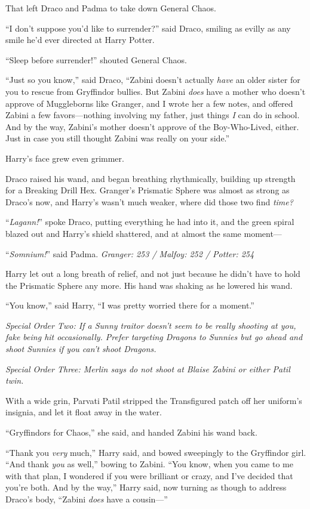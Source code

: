 That left Draco and Padma to take down General Chaos.

“I don’t suppose you’d like to surrender?” said Draco, smiling as evilly as any smile he’d ever directed at Harry Potter.

“Sleep before surrender!” shouted General Chaos.

“Just so you know,” said Draco, “Zabini doesn’t actually \emph{have} an older sister for you to rescue from Gryffindor bullies. But Zabini \emph{does} have a mother who doesn’t approve of Muggleborns like Granger, and I wrote her a few notes, and offered Zabini a few favors—nothing involving my father, just things \emph{I} can do in school. And by the way, Zabini’s mother doesn’t approve of the Boy-Who-Lived, either. Just in case you still thought Zabini was really on your side.”

Harry’s face grew even grimmer.

Draco raised his wand, and began breathing rhythmically, building up strength for a Breaking Drill Hex. Granger’s Prismatic Sphere was almost as strong as Draco’s now, and Harry’s wasn’t much weaker, where did those two find \emph{time?}

“\emph{Lagann!}” spoke Draco, putting everything he had into it, and the green spiral blazed out and Harry’s shield shattered, and at almost the same moment—

“\emph{Somnium!}” said Padma.
\sbreak
\emph{Granger: 253 / Malfoy: 252 / Potter: 254}

Harry let out a long breath of relief, and not just because he didn’t have to hold the Prismatic Sphere any more. His hand was shaking as he lowered his wand.

“You know,” said Harry, “I was pretty worried there for a moment.”

\emph{Special Order Two: If a Sunny traitor doesn’t seem to be really shooting at you, fake being hit occasionally. Prefer targeting Dragons to Sunnies but go ahead and shoot Sunnies if you can’t shoot Dragons.}

\emph{Special Order Three: Merlin says do not shoot at Blaise Zabini or either Patil twin.}

With a wide grin, Parvati Patil stripped the Transfigured patch off her uniform’s insignia, and let it float away in the water.

“Gryffindors for Chaos,” she said, and handed Zabini his wand back.

“Thank you \emph{very} much,” Harry said, and bowed sweepingly to the Gryffindor girl. “And thank \emph{you} as well,” bowing to Zabini. “You know, when you came to me with that plan, I wondered if you were brilliant or crazy, and I’ve decided that you’re both. And by the way,” Harry said, now turning as though to address Draco’s body, “Zabini \emph{does} have a cousin—”


